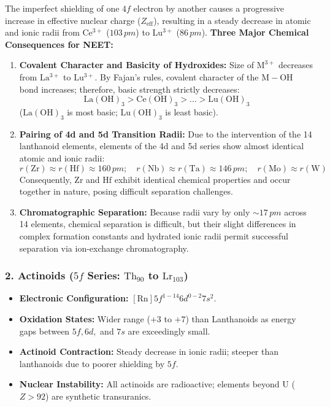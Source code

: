 \documentclass[10pt,twoside,openright]{book}
\begin{document}
\begin{ncertbox}
The imperfect shielding of one $4f$ electron by another causes a progressive increase in effective nuclear charge ($Z_{\mathrm{eff}}$), resulting in a steady decrease in atomic and ionic radii from $\mathrm{Ce^{3+}}$ ($103\,\si{pm}$) to $\mathrm{Lu^{3+}}$ ($86\,\si{pm}$).
\textbf{Three Major Chemical Consequences for NEET:}
\begin{enumerate}
  \item \textbf{Covalent Character and Basicity of Hydroxides:} Size of $\mathrm{M^{3+}}$ decreases from $\mathrm{La^{3+}}$ to $\mathrm{Lu^{3+}}$. By Fajan's rules, covalent character of the $\mathrm{M-OH}$ bond increases; therefore, basic strength strictly decreases:
  \begin{equation*}
    \mathrm{La(OH)_3} > \mathrm{Ce(OH)_3} > \dots > \mathrm{Lu(OH)_3}
  \end{equation*}
  ($\mathrm{La(OH)_3}$ is most basic; $\mathrm{Lu(OH)_3}$ is least basic).
  \item \textbf{Pairing of 4d and 5d Transition Radii:} Due to the intervention of the 14 lanthanoid elements, elements of the 4d and 5d series show almost identical atomic and ionic radii:
  \begin{equation*}
    r(\mathrm{Zr}) \approx r(\mathrm{Hf}) \approx 160\,\si{pm}; \quad r(\mathrm{Nb}) \approx r(\mathrm{Ta}) \approx 146\,\si{pm}; \quad r(\mathrm{Mo}) \approx r(\mathrm{W})
  \end{equation*}
  Consequently, $\mathrm{Zr}$ and $\mathrm{Hf}$ exhibit identical chemical properties and occur together in nature, posing difficult separation challenges.
  \item \textbf{Chromatographic Separation:} Because radii vary by only $\sim 17\,\si{pm}$ across 14 elements, chemical separation is difficult, but their slight differences in complex formation constants and hydrated ionic radii permit successful separation via ion-exchange chromatography.
\end{enumerate}
\end{ncertbox}

\subsubsection{2. Actinoids ($5f$ Series: $\mathrm{Th_{90}}$ to $\mathrm{Lr_{103}}$)}
\begin{itemize}[leftmargin=*]
  \item \textbf{Electronic Configuration:} $[\mathrm{Rn}] 5f^{1-14} 6d^{0-2} 7s^2$.
  \item \textbf{Oxidation States:} Wider range ($+3$ to $+7$) than Lanthanoids as energy gaps between $5f, 6d,$ and $7s$ are exceedingly small.
  \item \textbf{Actinoid Contraction:} Steady decrease in ionic radii; steeper than lanthanoids due to poorer shielding by $5f$.
  \item \textbf{Nuclear Instability:} All actinoids are radioactive; elements beyond U ($Z > 92$) are synthetic transuranics.
\end{itemize}
\end{document}
